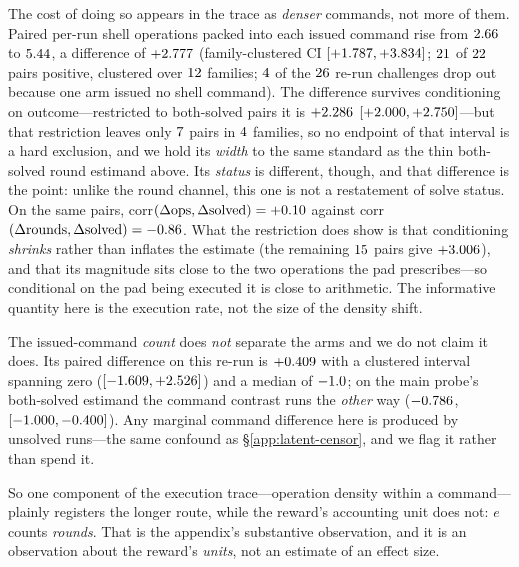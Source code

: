 The cost of doing so appears in the trace as \emph{denser} commands, not more of them.
Paired per-run shell operations packed into each issued command rise from
$2.66{}$ to $5.44{}$, a difference of
$+2.777{}$ (family-clustered CI $[+1.787{},+3.834{}]$;
$21{}$ of $22{}$ pairs positive, clustered over
$12{}$ families; $4{}$ of the $26{}$ re-run
challenges drop out because one arm issued no shell command). The difference survives
conditioning on outcome---restricted to both-solved pairs it is $+2.286{}$
$[+2.000{},+2.750{}]$---but that restriction leaves only
$7{}$ pairs in $4{}$ families, so no endpoint of
that interval is a hard exclusion, and we hold its \emph{width} to the same standard as
the thin both-solved round estimand above. Its \emph{status} is different, though, and
that difference is the point: unlike the round channel, this one is not a restatement of
solve status. On the same pairs, corr$(\Delta\text{ops},\Delta\text{solved})=
+0.10{}$ against corr$(\Delta\text{rounds},\Delta\text{solved})=
-0.86{}$. What the restriction does show is that conditioning
\emph{shrinks} rather than inflates the estimate (the remaining $15{}$ pairs
give $+3.006{}$), and that its magnitude sits close to the two operations the
pad prescribes---so conditional on the pad being executed it is close to arithmetic. The
informative quantity here is the execution rate, not the size of the density shift.

The issued-command \emph{count} does \emph{not} separate the arms and we do not claim it
does. Its paired difference on this re-run is $+0.409{}$ with a clustered interval
spanning zero ($[-1.609{},+2.526{}]$) and a median of
$-1.0{}$; on the main probe's both-solved estimand the command contrast runs
the \emph{other} way ($-0.786{}$,
$[-1.000{},-0.400{}]$). Any marginal command
difference here is produced by unsolved runs---the same confound as
\S\ref{app:latent-censor}, and we flag it rather than spend it.

So one component of the execution trace---operation density within a command---plainly
registers the longer route, while the reward's accounting unit does not: $e$ counts
\emph{rounds}. That is the appendix's substantive observation, and it is an observation
about the reward's \emph{units}, not an estimate of an effect size.

